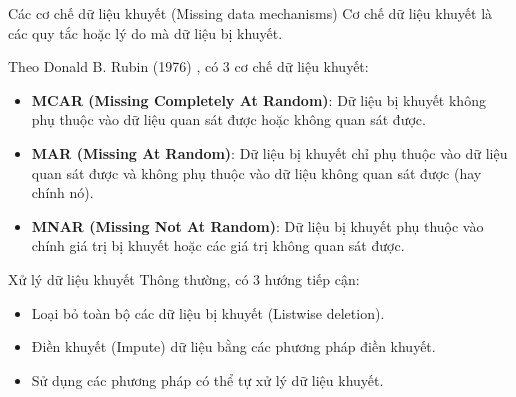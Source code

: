 \documentclass[aspectratio=169, 10pt]{beamer} %
\begin{document}
\begin{frame}{Các cơ chế dữ liệu khuyết (Missing data mechanisms)}
    Cơ chế dữ liệu khuyết là các quy tắc hoặc lý do mà dữ liệu bị khuyết.
    
    Theo Donald B. Rubin (1976) \cite{rubin1976inference}, có 3 cơ chế dữ liệu khuyết:
    \begin{itemize}
        \item \textbf{MCAR (Missing Completely At Random)}: Dữ liệu bị khuyết không phụ thuộc vào dữ liệu quan sát được hoặc không quan sát được.
        \item \textbf{MAR (Missing At Random)}: Dữ liệu bị khuyết chỉ phụ thuộc vào dữ liệu quan sát được và không phụ thuộc vào dữ liệu không quan sát được (hay chính nó).
        \item \textbf{MNAR (Missing Not At Random)}: 
        Dữ liệu bị khuyết phụ thuộc vào chính giá trị bị khuyết hoặc các giá trị không quan sát được.
    \end{itemize}
\end{frame}


\begin{frame}{Xử lý dữ liệu khuyết}
    Thông thường, có 3 hướng tiếp cận:
    \begin{itemize}
        \item Loại bỏ toàn bộ các dữ liệu bị khuyết (Listwise deletion).
        
        \item Điền khuyết (Impute) dữ liệu bằng các phương pháp điền khuyết.
        
        \item Sử dụng các phương pháp có thể tự xử lý dữ liệu khuyết.
    \end{itemize}    
\end{frame}
\end{document}
